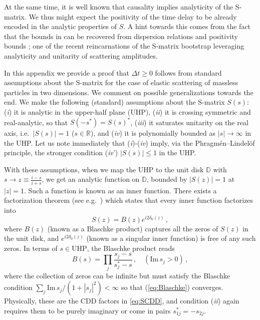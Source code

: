 \documentclass[
 reprint,
 amsmath,
 pre,
 amssymb,
 nofootinbib,
 aps,
 longbibliography,
]{revtex4-1}
\newcommand{\<}{{\langle}}
\renewcommand{\>}{{\rangle}}
\begin{document}
At the same time, it is well known that causality implies analyticity of the S-matrix. We thus might expect the positivity of the time delay to be already encoded in the analytic properties of $S$. A hint towards this comes from the fact that the bounds in \cite{Adams:2006sv,Camanho:2014apa} can be recovered from dispersion relations and positivity bounds \cite{Caron-Huot:2022ugt,Albert:2022oes}; one of the recent reincarnations of the S-matrix bootstrap leveraging analyticity and unitarity of scattering amplitudes.

In this appendix we provide a proof that $\Delta t\geq 0$ follows from standard assumptions about the S-matrix for the case of elastic scattering of massless particles in two dimensions. We comment on possible generalizations towards the end. We make the following (standard) assumptions about the S-matrix $S(s)$: (\textit{i}) it is analytic in the upper-half plane (UHP), (\textit{ii}) it is crossing symmetric and real-analytic, so that $S(-s^*) = S(s)^*$, (\textit{iii}) it saturates unitarity on the real axis, i.e.\ $|S(s)|=1$ ($s\in \mathbb R$), and (\textit{iv}) it is polynomially bounded as $|s|\to \infty$ in the UHP. Let us note immediately that (\textit{i})-(\textit{iv}) imply, via the Phragmén–Lindelöf principle, the stronger condition (\textit{iv}') $|S(s)|\leq 1$ in the UHP.

With these assumptions, when we map the UHP to the unit disk $\mathbb D$ with $s\to z\equiv \frac{i-s}{i+s}$, we get an analytic function on $\mathbb D$, bounded by $|S(z)|=1$ at $|z|=1$.
Such a function is known as an {inner function}. There exists a factorization theorem (see e.g.\ \cite[Ch.~II.6]{Garnett}) which states that every inner function factorizes into
\begin{equation}
    S(z) = B(z) e^{i2\delta_0(z)}\,,
\end{equation}
where $B(z)$ (known as a {Blaschke product}) captures all the zeros of $S(z)$ in the unit disk, and $e^{i2\delta_0(z)}$ (known as a {singular inner function}) is free of any such zeros. In terms of $s\in \text{UHP}$, the Blaschke product reads
\begin{equation}
    B(s) = \prod_j \frac{s_j - s}{s_j^* - s}\,, \quad (\text{Im}\,s_j>0)\,, \label{eq:Blaschke}
\end{equation}
where the collection of zeros can be infinite but must satisfy the {Blaschke condition} $\sum_j \text{Im}\,s_j/(1+|s_j|^2)<\infty$ so that (\ref{eq:Blaschke}) converges. Physically, these are the CDD factors in \eqref{eq:SCDD}, and condition (\textit{ii}) again requires them to be purely imaginary or come in pairs $s_{1j}^* = -s_{2j}$.
\end{document}
